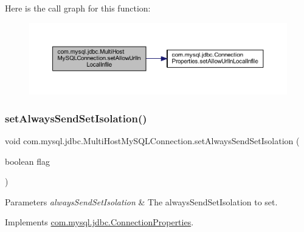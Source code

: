 Here is the call graph for this function\+:
\nopagebreak
\begin{figure}[H]
\begin{center}
\leavevmode
\includegraphics[width=350pt]{classcom_1_1mysql_1_1jdbc_1_1_multi_host_my_s_q_l_connection_a65ced19d9988a77826c138d8d2f1574e_cgraph}
\end{center}
\end{figure}
\mbox{\label{classcom_1_1mysql_1_1jdbc_1_1_multi_host_my_s_q_l_connection_af0ef05e04bfe22b5ac3e8108ea2bc3cc}} 
\subsubsection{\texorpdfstring{set\+Always\+Send\+Set\+Isolation()}{setAlwaysSendSetIsolation()}}
{\footnotesize\ttfamily void com.\+mysql.\+jdbc.\+Multi\+Host\+My\+S\+Q\+L\+Connection.\+set\+Always\+Send\+Set\+Isolation (\begin{DoxyParamCaption}\item[{boolean}]{flag }\end{DoxyParamCaption})}


\begin{DoxyParams}{Parameters}
{\em always\+Send\+Set\+Isolation} & The always\+Send\+Set\+Isolation to set. \\
\hline
\end{DoxyParams}


Implements \mbox{\hyperlink{interfacecom_1_1mysql_1_1jdbc_1_1_connection_properties_a009faf68759b3c9b1c03a15abeff987c}{com.\+mysql.\+jdbc.\+Connection\+Properties}}.

